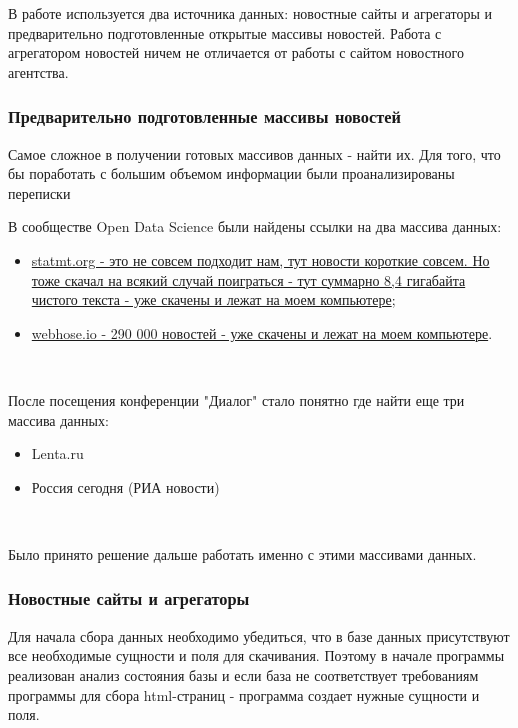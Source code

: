 В работе используется два источника данных: новостные сайты и агрегаторы и предварительно подготовленные открытые массивы новостей. Работа с агрегатором новостей ничем не отличается от работы с сайтом новостного агентства.

\subsubsection{Предварительно подготовленные массивы новостей}

Самое сложное в получении готовых массивов данных - найти их. Для того, что бы поработать с большим объемом информации были проанализированы переписки 

В сообществе Open Data Science были найдены ссылки на два массива данных:

\begin{itemize}
    \item \href{http://www.statmt.org/wmt15/translation-task.html}{statmt.org - это не совсем подходит нам, тут новости короткие совсем. Но тоже скачал на всякий случай поиграться - тут суммарно 8,4 гигабайта чистого текста - уже скачены и лежат на моем компьютере};
    \item \href{https://webhose.io/free-datasets/russian-news-articles/}{webhose.io - 290 000 новостей - уже скачены и лежат на моем компьютере}.
\end{itemize}
~\

После посещения конференции "Диалог" стало понятно где найти еще три массива данных: 

\begin{itemize}
    \item Lenta.ru
    \item Россия сегодня (РИА новости)
\end{itemize}
~\

Было принято решение дальше работать именно с этими массивами данных.

\subsubsection{Новостные сайты и агрегаторы}

Для начала сбора данных необходимо убедиться, что в базе данных присутствуют все необходимые сущности и поля для скачивания. Поэтому в начале программы реализован анализ состояния базы и если база не соответствует требованиям программы для сбора html-страниц - программа создает нужные сущности и поля.

